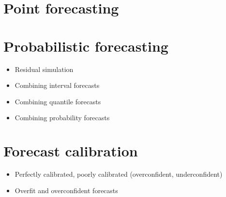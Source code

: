 \documentclass[11pt]{article}
\begin{document}
\section{Point forecasting}


\section{Probabilistic forecasting}
\begin{itemize}
\item Residual simulation
\item Combining interval forecasts
\item Combining quantile forecasts
\item Combining probability forecasts
\end{itemize}


\section{Forecast calibration}
\begin{itemize}
\item Perfectly calibrated, poorly calibrated (overconfident, underconfident)
\item Overfit and overconfident forecasts
\end{itemize}




\end{document}
